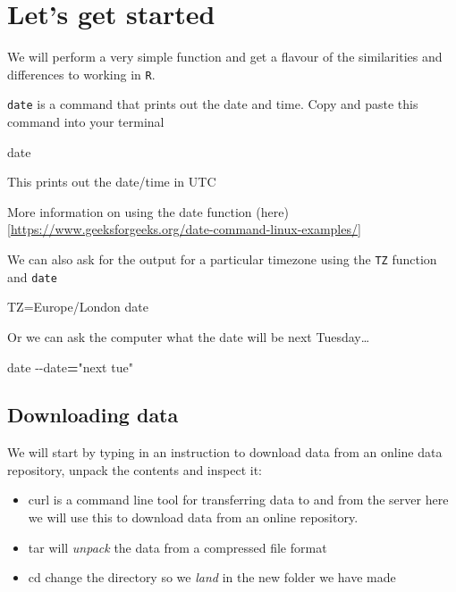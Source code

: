 \documentclass[
]{book}
\newenvironment{Shaded}{\begin{snugshade}}{\end{snugshade}}
\newcommand{\AttributeTok}[1]{\textcolor[rgb]{0.77,0.63,0.00}{#1}}
\newcommand{\FunctionTok}[1]{\textcolor[rgb]{0.00,0.00,0.00}{#1}}
\newcommand{\NormalTok}[1]{#1}
\newcommand{\OperatorTok}[1]{\textcolor[rgb]{0.81,0.36,0.00}{\textbf{#1}}}
\newcommand{\StringTok}[1]{\textcolor[rgb]{0.31,0.60,0.02}{#1}}
\newcommand{\VariableTok}[1]{\textcolor[rgb]{0.00,0.00,0.00}{#1}}
\begin{document}
\hypertarget{lets-get-started}{%
\section{Let's get started}\label{lets-get-started}}

We will perform a very simple function and get a flavour of the similarities and differences to working in \texttt{R}.

\texttt{date} is a command that prints out the date and time. Copy and paste this command into your terminal

\begin{Shaded}
\begin{Highlighting}[]
    \FunctionTok{date}
\end{Highlighting}
\end{Shaded}

This prints out the date/time in UTC

More information on using the date function (here){[}\url{https://www.geeksforgeeks.org/date-command-linux-examples/}{]}

We can also ask for the output for a particular timezone using the \texttt{TZ} function and \texttt{date}

\begin{Shaded}
\begin{Highlighting}[]
    \VariableTok{TZ=}\NormalTok{Europe/London }\FunctionTok{date}
\end{Highlighting}
\end{Shaded}

Or we can ask the computer what the date will be next Tuesday\ldots{}

\begin{Shaded}
\begin{Highlighting}[]
    \FunctionTok{date} \AttributeTok{{-}{-}date}\OperatorTok{=}\StringTok{"next tue"}
\end{Highlighting}
\end{Shaded}

\hypertarget{downloading-data}{%
\subsection{Downloading data}\label{downloading-data}}

We will start by typing in an instruction to download data from an online data repository, unpack the contents and inspect it:

\begin{itemize}
\item
  curl is a command line tool for transferring data to and from the server here we will use this to download data from an online repository.
\item
  tar will \emph{unpack} the data from a compressed file format
\item
  cd change the directory so we \emph{land} in the new folder we have made
\end{itemize}
\end{document}
